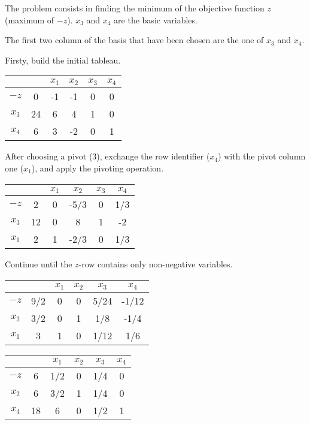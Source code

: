 The problem consists in finding the minimum of the objective function $z$ (maximum of $-z$).
$x_3$ and $x_4$ are the basic variables.

The first two column of the basis that have been chosen are the one of $x_3$ and $x_4$.

Firsty, build the initial tableau.

\begin{center}
    \begin{tabular}{c|c|cccc}
        & & $x_1$ & $x_2$ & $x_3$ & $x_4$ \\ \hline
        $-z$ & 0 & -1 & -1 & 0 & 0 \\ \hline
        $x_3$ & 24 & 6 & 4 & 1 & 0 \\
        $x_4$ & 6 & 3 & -2 & 0 & 1
    \end{tabular}
\end{center}

After choosing a pivot (3), exchange the row identifier ($x_4$) with the pivot column one ($x_1$), and apply the pivoting operation.

\begin{center}
    \begin{tabular}{c|c|cccc}
        & & $x_1$ & $x_2$ & $x_3$ & $x_4$ \\ \hline
        $-z$ & 2 & 0 & -5/3 & 0 & 1/3 \\ \hline
        $x_3$ & 12 & 0 & 8 & 1 & -2 \\
        $x_1$ & 2 & 1 & -2/3 & 0 & 1/3
    \end{tabular}
\end{center}

Continue until the $z$-row contains only non-negative variables.

\begin{center}
    \begin{tabular}{c|c|cccc}
        & & $x_1$ & $x_2$ & $x_3$ & $x_4$ \\ \hline
        $-z$ & 9/2 & 0 & 0 & 5/24 & -1/12 \\ \hline
        $x_2$ & 3/2 & 0 & 1 & 1/8 & -1/4 \\
        $x_1$ & 3 & 1 & 0 & 1/12 & 1/6
    \end{tabular}
\end{center}

\begin{center}
    \begin{tabular}{c|c|cccc}
        & & $x_1$ & $x_2$ & $x_3$ & $x_4$ \\ \hline
        $-z$ & 6 & 1/2 & 0 & 1/4 & 0 \\ \hline
        $x_2$ & 6 & 3/2 & 1 & 1/4 & 0 \\
        $x_4$ & 18 & 6 & 0 & 1/2 & 1
    \end{tabular}
\end{center}

